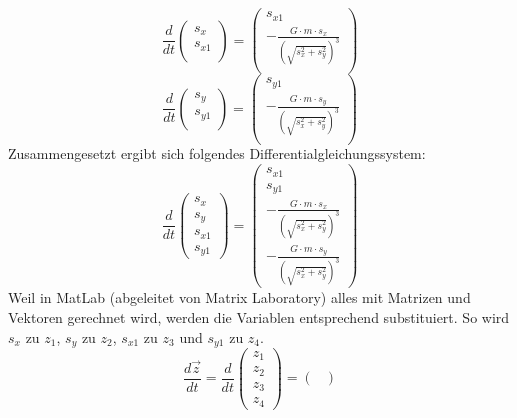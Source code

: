 \begin{refsection}
\begin{equation}
\frac{d}{dt} \begin{pmatrix}
s_x \\ 
s_{x1}\\
\end{pmatrix} = \begin{pmatrix}
s_{x1} \\ 
-\frac{G \cdot m \cdot s_x}{(\sqrt{s_x^2 + s_y^2})^3} \\
\end{pmatrix}
\end{equation}
\begin{equation}
\frac{d}{dt} \begin{pmatrix}
s_y \\ 
s_{y1}\\
\end{pmatrix} = \begin{pmatrix}
s_{y1} \\ 
-\frac{G \cdot m \cdot s_y}{(\sqrt{s_x^2 + s_y^2})^3} \\
\end{pmatrix}
\end{equation}
Zusammengesetzt ergibt sich folgendes Differentialgleichungssystem:
\begin{equation}
\frac{d}{dt} \begin{pmatrix}
s_x \\ 
s_y \\
s_{x1}\\
s_{y1}
\end{pmatrix} = \begin{pmatrix}
s_{x1} \\ 
s_{y1}\\
-\frac{G \cdot m \cdot s_x}{(\sqrt{s_x^2 + s_y^2})^3} \\
-\frac{G \cdot m \cdot s_y}{(\sqrt{s_x^2 + s_y^2})^3}
\end{pmatrix}
\end{equation}
Weil in MatLab (abgeleitet von Matrix Laboratory) alles mit Matrizen und Vektoren gerechnet wird, werden die Variablen entsprechend substituiert. So wird $s_x$ zu $z_1$, $s_y$ zu $z_2$, $s_{x1}$ zu $z_3$ und $s_{y1}$ zu $z_4$.
\begin{equation}\label{eq:zustandsraumdarst}
\frac{d \vec{z}}{dt}=\frac{d}{dt} \begin{pmatrix}
z_1 \\ 
z_2 \\
z_3 \\
z_4
\end{pmatrix} = \begin{pmatrix}

\end{pmatrix}
\end{equation}
\end{refsection}
